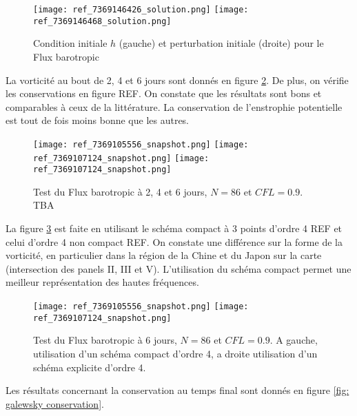 \begin{figure}[htbp]
\begin{center}
\texttt{[image: ref\_7369146426\_solution.png]}
\texttt{[image: ref\_7369146468\_solution.png]}
\end{center}
\caption{Condition initiale $h$ (gauche) et perturbation initiale (droite) pour le Flux barotropic \cite{Galewsky2004}}
\label{fig: initiale et perturbation Galewsky}
\end{figure}

La vorticité au bout de 2, 4 et 6 jours sont donnés en figure \ref{fig: galewsky 246}. De plus, on vérifie les conservations en figure REF. On constate que les résultats sont bons et comparables à ceux de la littérature. La conservation de l'enstrophie potentielle est tout de fois moins bonne que les autres.

\begin{figure}[htbp]
\begin{center}
\texttt{[image: ref\_7369105556\_snapshot.png]}
\texttt{[image: ref\_7369107124\_snapshot.png]}
\texttt{[image: ref\_7369107124\_snapshot.png]}
\end{center}
\caption{Test du Flux barotropic \cite{Galewsky2004} à 2, 4 et 6 jours, $N=86$ et $CFL=0.9$. TBA}
\label{fig: galewsky 246}
\end{figure}

La figure \ref{fig: galewsky compact/explicite} est faite en utilisant le schéma compact à 3 points d'ordre 4 REF et celui d'ordre 4 non compact REF. On constate une différence sur la forme de la vorticité, en particulier dans la région de la Chine et du Japon sur la carte (intersection des panels II, III et V). L'utilisation du schéma compact permet une meilleur représentation des hautes fréquences.

\begin{figure}[htbp]
\begin{center}
\texttt{[image: ref\_7369105556\_snapshot.png]}
\texttt{[image: ref\_7369107124\_snapshot.png]}
\end{center}
\caption{Test du Flux barotropic \cite{Galewsky2004} à 6 jours, $N=86$ et $CFL=0.9$. A gauche, utilisation d'un schéma compact d'ordre 4, a droite utilisation d'un schéma explicite d'ordre 4.}
\label{fig: galewsky compact/explicite}
\end{figure}

Les résultats concernant la conservation au temps final sont donnés en figure \ref{fig: galewsky conservation}.

